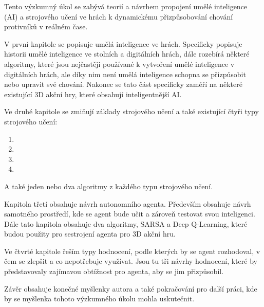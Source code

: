 Tento výzkumný úkol se zabývá teorií a návrhem propojení umělé inteligence (AI) a strojového učení ve hrách k dynamickému přizpůsobování chování protivníků v reálném čase.

V první kapitole se popisuje umělá inteligence ve hrách. Specificky popisuje historii umělé inteligence ve stolních a digitálních hrách, dále rozebírá některé algoritmy, které jsou nejčastěji používané k vytvoření umělé inteligence v digitálních hrách, ale díky nim není umělá inteligence schopna se přizpůsobit nebo upravit své chování. Nakonec se tato část specificky zaměří na některé existující 3D akční hry, které obsahují inteligentnější AI.

Ve druhé kapitole se zmiňují základy strojového učení a také existující čtyři typy strojového učení:
\begin{enumerate}
	\item {}
	\item {}
	\item {}	
	\item {}
\end{enumerate}
A také jeden nebo dva algoritmy z každého typu strojového učení.

Kapitola třetí obsahuje návrh autonomního agenta. Především obsahuje návrh samotného prostředí, kde se agent bude učit a zároveň testovat svou inteligenci. Dále tato kapitola obsahuje dva algoritmy, SARSA a Deep Q-Learning, které budou použity pro sestrojení agenta pro 3D akční hru.

Ve čtvrté kapitole řeším typy hodnocení, podle kterých by se agent rozhodoval, v čem se zlepšit a co nepotřebuje využívat. Jsou tu tři návrhy hodnocení, které by představovaly zajímavou obtížnost pro agenta, aby se jim přizpůsobil. 

Závěr obsahuje konečné myšlenky autora a také pokračování pro další práci, kde by se myšlenka tohoto výzkumného úkolu mohla uskutečnit.